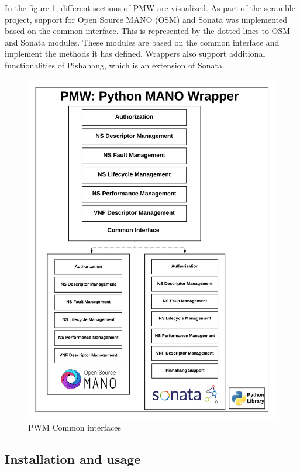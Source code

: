 In the figure \ref{fig:wrapperarch}, different sections of PMW are visualized. 
As part of the scramble project, support for Open Source MANO (OSM) and Sonata was implemented based on the common interface. 
This is represented by the dotted lines to OSM and Sonata modules. 
These modules are based on the common interface and implement the methods it has defined. 
Wrappers also support additional functionalities of Pishahang, which is an extension of Sonata. 

\begin{figure}
	\centering
	\includegraphics[width=1\linewidth]{figures/WrapperArch}
	\caption{PWM Common interfaces}
	\label{fig:wrapperarch}
\end{figure}

\subsection{Installation and usage}


